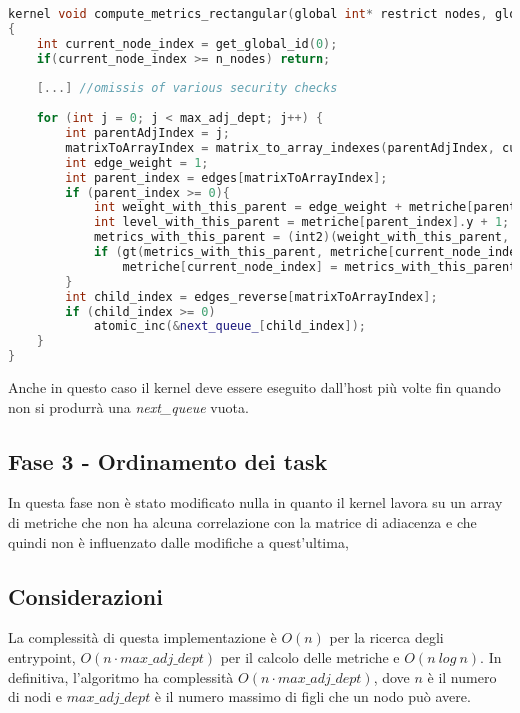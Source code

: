 \documentclass[../relazione.tex]{subfiles}
\begin{document}
\begin{lstlisting}[language=C++, caption={Compute metrics kernel II},captionpos=b]
kernel void compute_metrics_rectangular(global int* restrict nodes, global int* queue_, global int* next_queue_, const int n_nodes, global edge_t* restrict edges, global edge_t* restrict edges_reverse, volatile global int2* metriche, const int max_adj_dept)
{
	int current_node_index = get_global_id(0);
	if(current_node_index >= n_nodes) return;
	
	[...] //omissis of various security checks
	
	for (int j = 0; j < max_adj_dept; j++) {
		int parentAdjIndex = j;
		matrixToArrayIndex = matrix_to_array_indexes(parentAdjIndex, current_node_index, n_nodes);
		int edge_weight = 1;
		int parent_index = edges[matrixToArrayIndex];
		if (parent_index >= 0){
			int weight_with_this_parent = edge_weight + metriche[parent_index].x + nodes[current_node_index];
			int level_with_this_parent = metriche[parent_index].y + 1;
			metrics_with_this_parent = (int2)(weight_with_this_parent, level_with_this_parent);
			if (gt(metrics_with_this_parent, metriche[current_node_index]))
				metriche[current_node_index] = metrics_with_this_parent;
		}
		int child_index = edges_reverse[matrixToArrayIndex];
		if (child_index >= 0)
			atomic_inc(&next_queue_[child_index]);
	}
}
\end{lstlisting}

Anche in questo caso il kernel deve essere eseguito dall'host più volte fin quando non si produrrà una \textit{next\_queue} vuota.

\subsection{Fase 3 - Ordinamento dei task}
In questa fase non è stato modificato nulla in quanto il kernel lavora su un array di metriche che non ha alcuna correlazione con la matrice di adiacenza e che quindi non è influenzato dalle modifiche a quest'ultima,

\subsection{Considerazioni}
La complessità di questa implementazione è $O(n)$ per la ricerca degli entrypoint, $O(n \cdot max\_adj\_dept)$ per il calcolo delle metriche e $O(n\ log\ n)$.
In definitiva, l'algoritmo ha complessità $O(n \cdot max\_adj\_dept)$, dove $n$ è il numero di nodi e $max\_adj\_dept$ è il numero massimo di figli che un nodo può avere.
\end{document}
